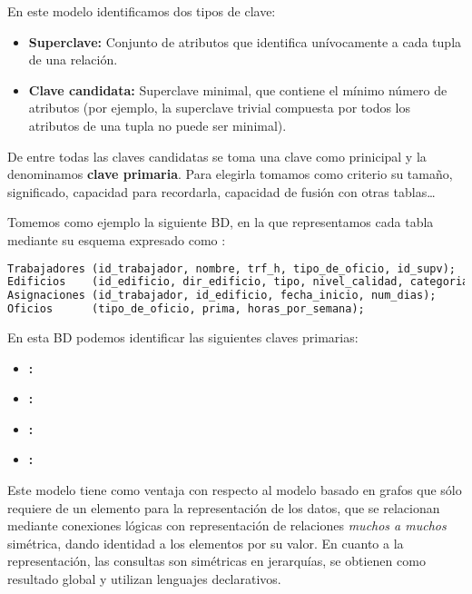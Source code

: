 En este modelo identificamos dos tipos de clave:

\begin{itemize}
	\item\textbf{Superclave:} Conjunto de atributos que identifica unívocamente a cada tupla de una relación.
	\item\textbf{Clave candidata:} Superclave minimal, que contiene el mínimo número de atributos (por ejemplo, la superclave trivial compuesta por todos los atributos de una tupla no puede ser minimal).
\end{itemize}

De entre todas las claves candidatas se toma una clave como prinicipal y la denominamos \textbf{clave primaria}.
Para elegirla tomamos como criterio su tamaño, significado, capacidad para recordarla, capacidad de fusión con otras tablas\ldots

Tomemos como ejemplo la siguiente BD, en la que representamos cada tabla mediante su esquema expresado como :

\begin{lstlisting}[language=SQL]
Trabajadores (id_trabajador, nombre, trf_h, tipo_de_oficio, id_supv);
Edificios    (id_edificio, dir_edificio, tipo, nivel_calidad, categoria);
Asignaciones (id_trabajador, id_edificio, fecha_inicio, num_dias);
Oficios      (tipo_de_oficio, prima, horas_por_semana);
\end{lstlisting}

En esta BD podemos identificar las siguientes claves primarias:

\begin{itemize}
	\item{}\textbf{:} 
	\item{}\textbf{:} 
	\item{}\textbf{:} 
	\item{}\textbf{:} 
\end{itemize}

Este modelo tiene como ventaja con respecto al modelo basado en grafos que sólo requiere de un elemento para la representación de los datos, que se relacionan mediante conexiones lógicas con representación de relaciones \textit{muchos a muchos} simétrica, dando identidad a los elementos por su valor.
En cuanto a la representación, las consultas son simétricas en jerarquías, se obtienen como resultado global y utilizan lenguajes declarativos.
